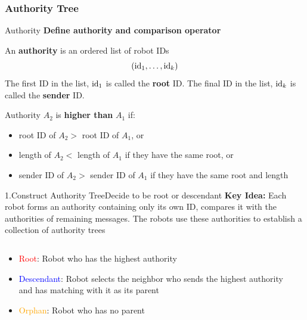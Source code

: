 \documentclass[10pt]{beamer}
\newcommand{\id}{{\rm id}}
\begin{document}
\subsubsection{Authority Tree}
\begin{frame}{Authority}
  \textbf{Define authority and comparison operator}
  \begin{definition}
    \small{An \textbf{authority} is an ordered list of robot IDs
      $$(\id_1, \ldots, \id_k)$$
      The first ID in the list, $\id_1$ is called the \textbf{root} ID.
      The final ID in the list, $\id_k$ is called the \textbf{sender} ID.}
  \end{definition}
  \begin{definition}
    \small{Authority $A_2$ is \textbf{higher than} $A_1$ if:}
    \begin{itemize}
    \item \small{root ID of $A_2 >$ root ID of $A_1$, or}
    \item \small{length of $A_2 <$  length of $A_1$ if they have the same root, or}
    \item \small{sender ID of $A_2 >$ sender ID of $A_1$ if they have the same root and length}
    \end{itemize}
  \end{definition}
\end{frame}
\begin{frame}{1.Construct Authority Tree}{Decide to be root or descendant}
  \textbf{Key Idea:} Each robot forms an authority containing only its own ID,
  compares it with the authorities of remaining messages. The robots use these
  authorities to establish a collection of authority trees
  \begin{columns}[T] %
    \begin{column}{.45\textwidth}
      \begin{itemize}
      \item {\textcolor{red}{Root}: Robot who has the highest authority}
      \item {\textcolor{blue}{Descendant}: Robot selects the neighbor who sends
          the highest authority and has matching with it as its parent}
      \item {\textcolor{orange}{Orphan}: Robot who has no parent}
      \end{itemize}     
    \end{column}%
    \begin{column}{.5\textwidth}
       
    \end{column}
  \end{columns}
\end{frame}
\end{document}
